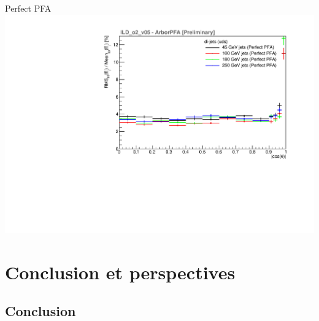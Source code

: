 \documentclass[8pt]{beamer}
\begin{document}
\begin{frame}
\begin{minipage}{0.49\linewidth}
\begin{center}
        Perfect PFA \\
        \includegraphics[width=\linewidth]{ILDArborPFA_PerfectResolution_NoNeutralHadron.pdf}
      \end{center}
    \end{minipage}
  \end{frame}
























  \section{Conclusion et perspectives}

  \begin{frame}
  \frametitle{\secname}
    \tableofcontents[currentsection]
  \end{frame}

  \subsection*{Conclusion}
\end{document}
